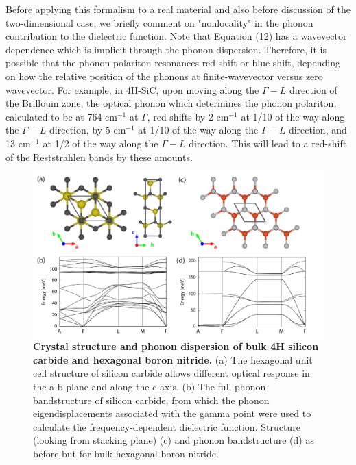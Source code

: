 \documentclass[superscriptaddress,reprint,prb]{revtex4-1}
\begin{document}
Before applying this formalism to a real material and also before discussion of the two-dimensional case, we briefly comment on "nonlocality" in the phonon contribution to the dielectric function. Note that Equation (12) has a wavevector dependence which is implicit through the phonon dispersion.  Therefore, it is possible that the phonon polariton resonances red-shift or blue-shift, depending on how the relative position of the phonons at finite-wavevector versus zero wavevector. For example, in 4H-SiC, upon moving along the $\Gamma-L$ direction of the Brillouin zone, the optical phonon which determines the phonon polariton, calculated to be at 764 cm$^{-1}$ at $\Gamma$, red-shifts by 2  cm$^{-1}$ at 1/10 of the way along the $\Gamma-L$ direction, by 5 cm$^{-1}$ at 1/10 of the way along the $\Gamma-L$ direction, and 13 cm$^{-1}$ at 1/2 of the way along the $\Gamma-L$ direction. This will lead to a red-shift of the Reststrahlen bands by these amounts.
\begin{figure}[t]
\includegraphics[width=16cm]{combined_structure.pdf}
\caption{\textbf{Crystal structure and phonon dispersion of bulk 4H silicon carbide and hexagonal boron nitride.} (a) The hexagonal unit cell structure of silicon carbide allows different optical response in the a-b plane and along the c axis. (b) The full phonon bandstructure of silicon carbide, from which the phonon eigendisplacements associated with the gamma point were used to calculate the frequency-dependent dielectric function. Structure (looking from stacking plane) (c) and phonon bandstructure (d) as before but for bulk hexagonal boron nitride.}
\label{fig:phonons}
\end{figure}
\end{document}
